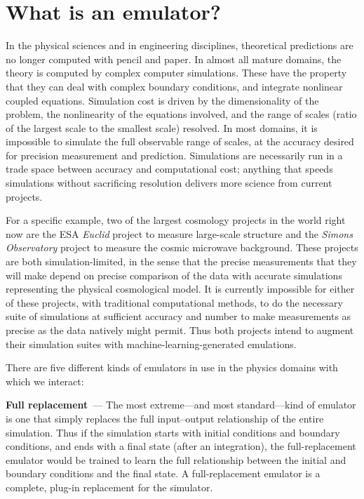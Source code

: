 \documentclass[11pt]{article}
\renewcommand{\paragraph}[1]{\smallskip\par\noindent\textbf{#1}~---}
\begin{document}
\section{What is an emulator?}
In the physical sciences and in engineering disciplines, theoretical predictions are no longer computed with pencil and paper.
In almost all mature domains, the theory is computed by complex computer simulations.
These have the property that they can deal with complex boundary conditions, and integrate nonlinear coupled equations.
Simulation cost is driven by the dimensionality of the problem, the nonlinearity of the equations involved, and the range of scales (ratio of the largest scale to the smallest scale) resolved.
In most domains, it is impossible to simulate the full observable range of scales, at the accuracy desired for precision measurement and prediction.
Simulations are necessarily run in a trade space between accuracy and computational cost; anything that speeds simulations without sacrificing resolution delivers more science from current projects.

For a specific example, two of the largest cosmology projects in the world right now are the ESA \textsl{Euclid} project to measure large-scale structure \cite{euclid} and the \textsl{Simons Observatory} project to measure the cosmic microwave background.
These projects are both simulation-limited, in the sense that the precise measurements that they will make depend on precise comparison of the data with accurate simulations representing the physical cosmological model.
It is currently impossible for either of these projects, with traditional computational methods, to do the necessary suite of simulations at sufficient accuracy and number to make measurements as precise as the data natively might permit.
Thus both projects intend to augment their simulation suites with ma\-chine-learn\-ing-gen\-er\-a\-ted emulations.

There are five different kinds of emulators in use in the physics domains with which we interact:

\paragraph{Full replacement}
The most extreme---and most standard---kind of emulator is one that simply replaces the full input--output relationship of the entire simulation.
Thus if the simulation starts with initial conditions and boundary conditions, and ends with a final state (after an integration), the full-replacement emulator would be trained to learn the full relationship between the initial and boundary conditions and the final state.
A full-replacement emulator is a complete, plug-in replacement for the simulator.
\end{document}
